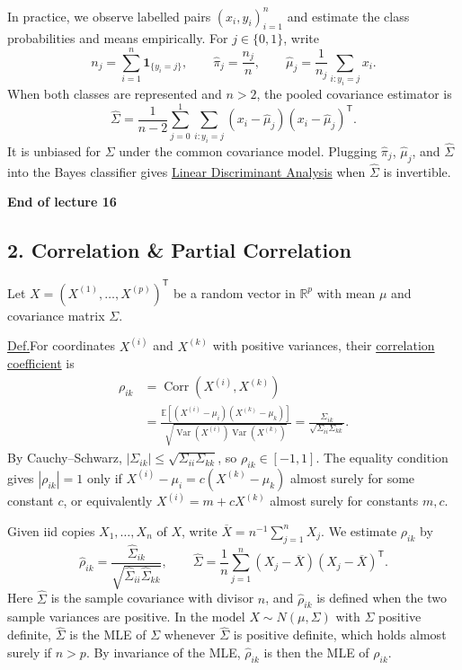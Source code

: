 \documentclass[11pt,a4paper]{article}
\begin{document}
In practice, we observe labelled pairs $(x_i,y_i)_{i=1}^n$ and estimate
the class probabilities and means empirically. For $j\in\{0,1\}$, write
\[
n_j=\sum_{i=1}^n\mathbf{1}_{\{y_i=j\}},\qquad
\hat\pi_j=\frac{n_j}{n},\qquad
\hat\mu_j=\frac{1}{n_j}\sum_{i:y_i=j}x_i.
\]
When both classes are represented and $n>2$, the pooled covariance
estimator is
\[
\hat\Sigma=\frac{1}{n-2}\sum_{j=0}^1\sum_{i:y_i=j}
(x_i-\hat\mu_j)(x_i-\hat\mu_j)^{\mathsf T}.
\]
It is unbiased for $\Sigma$ under the common covariance model.
Plugging $\hat\pi_j$, $\hat\mu_j$, and $\hat\Sigma$ into the Bayes
classifier gives \underline{Linear Discriminant Analysis} when
$\hat\Sigma$ is invertible.

\begin{center}
\textbf{End of lecture 16}
\end{center}

\subsection*{2. Correlation \& Partial Correlation}

Let $X=(X^{(1)},\ldots,X^{(p)})^{\mathsf T}$ be a random vector in
$\mathbb R^p$ with mean $\mu$ and covariance matrix $\Sigma$.

\medskip
\noindent\underline{Def.}\quad For coordinates $X^{(i)}$ and $X^{(k)}$
with positive variances, their \underline{correlation coefficient} is
\[
\begin{aligned}
\rho_{ik}
&=\operatorname{Corr}(X^{(i)},X^{(k)})\\
&=\frac{\mathbb E[(X^{(i)}-\mu_i)(X^{(k)}-\mu_k)]}
        {\sqrt{\operatorname{Var}(X^{(i)})\operatorname{Var}(X^{(k)})}}
 =\frac{\Sigma_{ik}}{\sqrt{\Sigma_{ii}\Sigma_{kk}}}.
\end{aligned}
\]
By Cauchy--Schwarz, $|\Sigma_{ik}|\leq\sqrt{\Sigma_{ii}\Sigma_{kk}}$,
so $\rho_{ik}\in[-1,1]$. The equality condition gives
$|\rho_{ik}|=1$ only if $X^{(i)}-\mu_i=c(X^{(k)}-\mu_k)$ almost surely
for some constant $c$, or equivalently $X^{(i)}=m+cX^{(k)}$ almost surely
for constants $m,c$.

Given iid copies $X_1,\ldots,X_n$ of $X$, write
$\overline X=n^{-1}\sum_{j=1}^nX_j$. We estimate $\rho_{ik}$ by
\[
\hat\rho_{ik}=\frac{\hat\Sigma_{ik}}{\sqrt{\hat\Sigma_{ii}\hat\Sigma_{kk}}},
\qquad
\hat\Sigma=\frac1n\sum_{j=1}^n(X_j-\overline X)(X_j-\overline X)^{\mathsf T}.
\]
Here $\hat\Sigma$ is the sample covariance with divisor $n$, and
$\hat\rho_{ik}$ is defined when the two sample variances are positive.
In the model $X\sim N(\mu,\Sigma)$ with $\Sigma$ positive definite,
$\hat\Sigma$ is the MLE of $\Sigma$ whenever $\hat\Sigma$ is positive
definite, which holds almost surely if $n>p$. By invariance of the MLE,
$\hat\rho_{ik}$ is then the MLE of $\rho_{ik}$.
\end{document}
